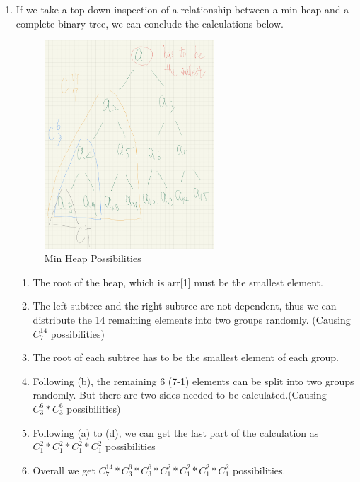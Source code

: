 \documentclass{article}
\begin{document}
\begin{CJK*}{UTF8}{bsmi}
\begin{enumerate}
    \item If we take a top-down inspection of a relationship between a min heap and a complete binary tree, we can conclude the calculations below.
            \begin{figure}[h]
            \centering
            \includegraphics[width=0.6\textwidth]{IMG_0259.jpg}
            \caption{Min Heap Possibilities}
            \label{fig:my_label}
        \end{figure}
        \begin{enumerate}
            \item The root of the heap, which is arr[1] must be the smallest element.
            \item The left subtree and the right subtree are not dependent, thus we can distribute the 14 remaining elements into two groups randomly. (Causing $C^{14}_7$ possibilities)
            \item The root of each subtree has to be the smallest element of each group.
            \item Following (b), the remaining 6 (7-1) elements can be split into two groups randomly. But there are two sides needed to be calculated.(Causing $C^{6}_3 * C^{6}_3$ possibilities)
            \item Following (a) to (d), we can get the last part of the calculation as $C^{2}_1 * C^{2}_1 * C^{2}_1 * C^{2}_1$ possibilities
            \item Overall we get $C^{14}_7 * C^{6}_3 * C^{6}_3 * C^{2}_1 * C^{2}_1 * C^{2}_1 * C^{2}_1$ possibilities.
        \end{enumerate}


\end{enumerate}
\end{CJK*}
\end{document}
